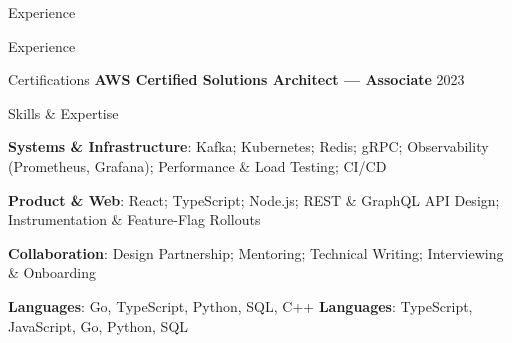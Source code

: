\else\ifx\layout\Vportfolio

\begin{rSection}{Experience}
\NorthwindBlock
\LakeshoreBlock
\end{rSection}
\ProjectSection
\EducationSection

\else

\begin{rSection}{Experience}
\NorthwindBlock
\LakeshoreBlock
\InternBlock
\end{rSection}
\EducationSection

\fi\fi%

\ifx\showcert\Vtrue
\begin{rSection}{Certifications}
\hspace{-0.2in} \textbf{AWS Certified Solutions Architect — Associate} \hfill 2023
\end{rSection}
\fi

\begin{rSection}{Skills \& Expertise}
{\small
\ifx\showsys\Vtrue
\textbf{Systems \& Infrastructure}: Kafka; Kubernetes; Redis; gRPC; Observability (Prometheus, Grafana); Performance \& Load Testing; CI/CD\ifx\showoncall{}\fi\vspace{-0.05in}

\fi
\ifx\showweb\Vtrue
\textbf{Product \& Web}: React; TypeScript; Node.js; REST \& GraphQL API Design; Instrumentation \& Feature-Flag Rollouts\vspace{-0.05in}

\fi
\ifx\showcomm\Vtrue
\textbf{Collaboration}: Design Partnership; Mentoring; Technical Writing; Interviewing \& Onboarding\vspace{-0.05in}

\fi
\ifx\showprog\Vtrue
\ifx\sline\Vgofirst
\textbf{Languages}: Go, TypeScript, Python, SQL, C++
\fi
\ifx\sline\Vtsfirst
\textbf{Languages}: TypeScript, JavaScript, Go, Python, SQL
\fi
\fi
}
\end{rSection}


